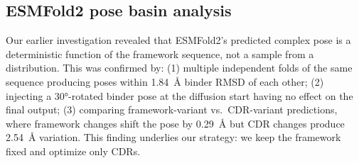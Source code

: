 \documentclass{nature}
\begin{document}
\subsection{ESMFold2 pose basin analysis}

Our earlier investigation revealed that ESMFold2's predicted complex pose is a deterministic function of the framework sequence, not a sample from a distribution. This was confirmed by: (1) multiple independent folds of the same sequence producing poses within \SI{1.84}{\angstrom} binder RMSD of each other; (2) injecting a \ang{30}-rotated binder pose at the diffusion start having no effect on the final output; (3) comparing framework-variant vs.\ CDR-variant predictions, where framework changes shift the pose by \SI{0.29}{\angstrom} but CDR changes produce \SI{2.54}{\angstrom} variation. This finding underlies our strategy: we keep the framework fixed and optimize only CDRs.
\end{document}
